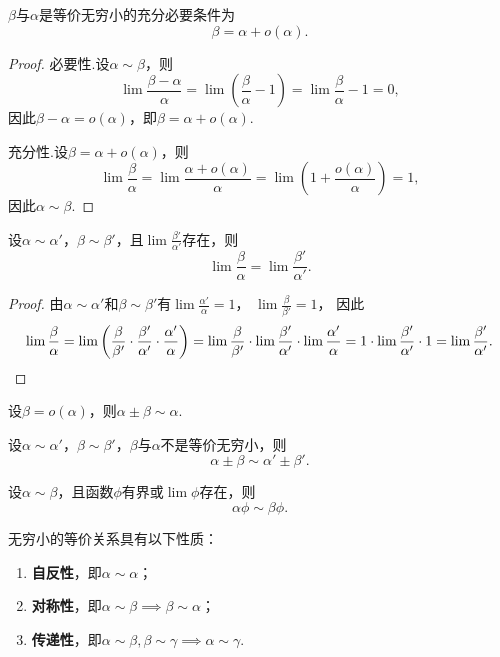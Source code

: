 \begin{theorem}\label{theorem:极限.无穷小的比较1}
\(\beta\)与\(\alpha\)是等价无穷小的充分必要条件为\[\beta=\alpha+o(\alpha).\]
\begin{proof}
必要性.设\(\alpha\sim\beta\)，则\[
\lim\frac{\beta-\alpha}{\alpha}
=\lim\left(\frac{\beta}{\alpha}-1\right)
=\lim\frac{\beta}{\alpha}-1 = 0,
\]因此\(\beta-\alpha=o(\alpha)\)，即\(\beta=\alpha+o(\alpha)\).

充分性.设\(\beta=\alpha+o(\alpha)\)，则\[
\lim\frac{\beta}{\alpha}
=\lim\frac{\alpha+o(\alpha)}{\alpha}
=\lim\left(1+\frac{o(\alpha)}{\alpha}\right) = 1,
\]因此\(\alpha\sim\beta\).
\end{proof}
\end{theorem}

\begin{theorem}\label{theorem:极限.无穷小的比较2}
设\(\alpha\sim\alpha'\)，\(\beta\sim\beta'\)，且\(\lim\frac{\beta'}{\alpha'}\)存在，则\[
	\lim\frac{\beta}{\alpha}=\lim\frac{\beta'}{\alpha'}.
\]
\begin{proof}
由\(\alpha\sim\alpha'\)和\(\beta\sim\beta'\)有\(\lim\frac{\alpha'}{\alpha} = 1\)，
\(\lim\frac{\beta}{\beta'} = 1\)，
因此\[
	\lim\frac{\beta}{\alpha}
	= \lim \left(
		\frac{\beta}{\beta'}
		\cdot \frac{\beta'}{\alpha'}
		\cdot \frac{\alpha'}{\alpha}
	\right)
	= \lim\frac{\beta}{\beta'}
		\cdot \lim \frac{\beta'}{\alpha'}
		\cdot \lim\frac{\alpha'}{\alpha}
	= 1 \cdot \lim \frac{\beta'}{\alpha'} \cdot 1
	= \lim \frac{\beta'}{\alpha'}.
	\qedhere
\]
\end{proof}
\end{theorem}

\begin{theorem}[和差取大规则]\label{theorem:极限.无穷小的比较3}
设\(\beta=o(\alpha)\)，则\(\alpha\pm\beta\sim\alpha\).
\end{theorem}

\begin{theorem}[和差代替规则]\label{theorem:极限.无穷小的比较4}
设\(\alpha\sim\alpha'\)，\(\beta\sim\beta'\)，\(\beta\)与\(\alpha\)不是等价无穷小，则\[
	\alpha\pm\beta\sim\alpha'\pm\beta'.
\]
\end{theorem}

\begin{theorem}[因式代替规则]\label{theorem:极限.无穷小的比较5}
设\(\alpha\sim\beta\)，且函数\(\phi\)有界或\(\lim\phi\)存在，则\[
	\alpha \phi \sim \beta \phi.
\]
\end{theorem}

\begin{property}\label{theorem:极限.无穷小的比较6}
无穷小的等价关系具有以下性质：
\begin{enumerate}
\item {\bf 自反性}，即\(\alpha \sim \alpha\)；
\item {\bf 对称性}，即\(\alpha \sim \beta \implies \beta \sim \alpha\)；
\item {\bf 传递性}，即\(\alpha \sim \beta, \beta \sim \gamma \implies \alpha \sim \gamma\).
\end{enumerate}
\end{property}

